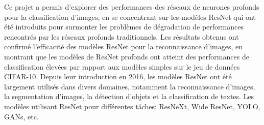 \documentclass{article}
\begin{document}
Ce projet a permis d'explorer des performances des réseaux de neurones profonds pour la classification d'images,
en se concentrant sur les modèles ResNet qui ont été introduits pour surmonter les problèmes de dégradation de
performances rencontrés par les réseaux profonds traditionnels.
Les résultats obtenus ont confirmé l'efficacité des modèles ResNet pour la reconnaissance d'images, en montrant
que les modèles de ResNet profonds ont atteint des performances de classification élevées par rapport aux modèles
simples sur le jeu de données CIFAR-10.
Depuis leur introduction en 2016, les modèles ResNet ont été largement utilisés dans divers domaines, notamment
la reconnaissance d'images, la segmentation d'images, la détection d'objets et la classification de textes.
Les modèles utilisant ResNet pour différentes tâches: ResNeXt, Wide ResNet, YOLO, GANs, etc.



\end{document}
